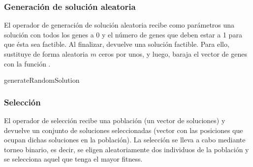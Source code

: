 \documentclass[10pt,a4paper]{article}
\begin{document}
\subsubsection{Generación de solución aleatoria}

El operador de generación de solución aleatoria recibe como parámetros una solución con todos los genes a 0 y el número de genes que deben estar a 1 para que ésta sea factible. Al finalizar, devuelve una solución factible. Para ello, sustituye de forma aleatoria $m$ ceros por unos, y luego, baraja el vector de genes con la función .\\

\begin{algorithm}[H]
	\caption{generateRandomSolution}
\end{algorithm}


\subsubsection{Selección}

El operador de selección recibe una población (un vector de soluciones) y devuelve un conjunto de soluciones seleccionadas (vector con las posiciones que ocupan dichas soluciones en la población). La selección se lleva a cabo mediante torneo binario, es decir, se eligen aleatoriamente dos individuos de la población y se selecciona aquel que tenga el mayor fitness.\\
\end{document}
